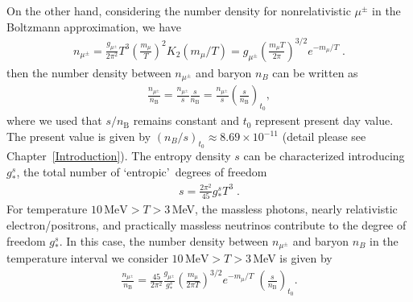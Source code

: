 On the other hand, considering the number density for nonrelativistic $\mu^\pm$ in the Boltzmann approximation, we have
\begin{align}\label{nmupm}
n_{\mu^\pm}=\frac{g_{\mu^\pm}}{2\pi^2}T^3\left(\frac{m_\mu}{T}\right)^2 K_2(m_\mu/T)=g_{\mu^\pm}\left(\frac{m_\mu T}{2\pi}\right)^{3/2}e^{-{m_\mu}/{T}}\;. 
\end{align}
then the number density between $n_{\mu^\pm}$ and baryon $n_B$ can be written as
\begin{align}
\frac{n_{\mu^\pm}}{n_\mathrm{B}}=\frac{n_{\mu^\pm}}{s}\frac{s}{n_\mathrm{B}}=
\frac{n_{\mu^\pm}}{s}\left(\frac{s}{n_\mathrm{B}}\right)_{\!t_0},
\end{align}
where we used that $s/n_\mathrm{B}$ remains constant and $t_0$ represent present day value. The present value is given by $(n_B/s)_{t_0}\approx8.69\times10^{-11}$ (detail please see Chapter~\ref{Introduction}). The entropy density $s$ can be characterized introducing $g^s_\ast$, the total number of \lq entropic\rq\ degrees of freedom
\begin{align}\label{entrop}
s=\frac{2\pi^2}{45}g^s_\ast T^3\;.
\end{align}
For temperature $10\,\mathrm{MeV} >T>3 $\,MeV, the massless photons, nearly relativistic electron/positrons, and practically massless neutrinos contribute to the degree of freedom $g^s_\ast$.  In this case, the number density between $n_{\mu^\pm}$ and baryon $n_B$ in the temperature interval we consider $10\,\mathrm{MeV} >T>3 $\,MeV is given by
\begin{align}\label{nmuperbF} 
\frac{n_{\mu^\pm}}{n_\mathrm{B}}=\frac{45}{2\pi^2}\frac{g_{\mu^\pm}}{g^s_\ast}\left(\frac{m_\mu}{2\pi T}\right)^{3/2}e^{-{m_\mu}/{T}}\;\left(\frac{s}{n_\mathrm{B}}\right)_{\!t_0}.
\end{align}


